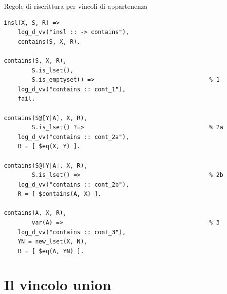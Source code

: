 \documentclass[12pt,a4paper,openright]{book}  %
\begin{document}
\begin{algorithm}[H]
	\caption{Regole di riscrittura per vincoli di appartenenza}
	\label{alg:in_constraints}
\end{algorithm}
\begin{verbatim}
insl(X, S, R) =>
    log_d_vv("insl :: -> contains"),
    contains(S, X, R).

contains(S, X, R),
        S.is_lset(),
        S.is_emptyset() =>                                 % 1
    log_d_vv("contains :: cont_1"),
    fail.

contains(S@[Y|A], X, R),
        S.is_lset() ?=>                                    % 2a
    log_d_vv("contains :: cont_2a"),
    R = [ $eq(X, Y) ].

contains(S@[Y|A], X, R),
        S.is_lset() =>                                     % 2b
    log_d_vv("contains :: cont_2b"),
    R = [ $contains(A, X) ].

contains(A, X, R),
        var(A) =>                                          % 3
    log_d_vv("contains :: cont_3"),
    YN = new_lset(X, N),
    R = [ $eq(A, YN) ].
\end{verbatim}

\section{Il vincolo union}
\end{document}
